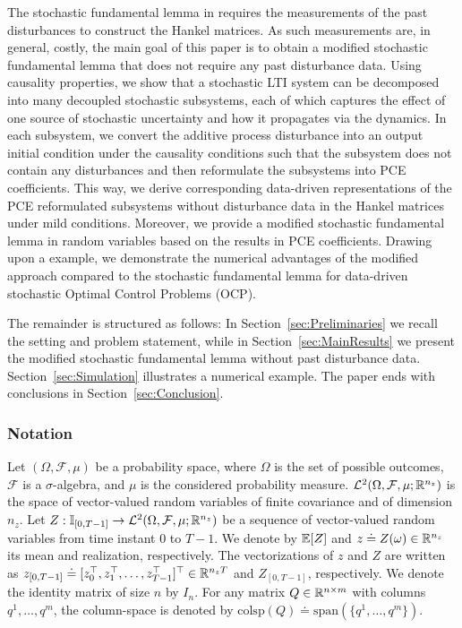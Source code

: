 The stochastic fundamental lemma in \citet{pan23stochastic} requires the measurements of the past disturbances to construct the Hankel matrices. As such measurements are, in general, costly, the main goal of this paper is to obtain a modified stochastic fundamental lemma that does not require any past disturbance data. Using causality properties, we show that a stochastic LTI system can be decomposed into many decoupled stochastic subsystems, each of which captures the effect of one source of stochastic uncertainty and how it propagates via the dynamics. In each subsystem, we convert the additive process disturbance into an output initial condition under the causality conditions such that the subsystem does not contain any disturbances and then reformulate the subsystems into PCE coefficients. This way, we derive corresponding data-driven representations of the PCE reformulated subsystems without disturbance data in the Hankel matrices under mild conditions. Moreover, we provide a modified stochastic fundamental lemma in random variables based on the results in PCE coefficients. Drawing upon a example, we demonstrate the numerical advantages of the modified approach compared to the stochastic fundamental lemma for data-driven stochastic Optimal Control Problems (OCP).

The remainder is structured as follows: In Section~\ref{sec:Preliminaries} we recall the setting and problem statement, while in Section~\ref{sec:MainResults} we present the modified stochastic fundamental lemma without past disturbance data. Section~\ref{sec:Simulation} illustrates a numerical example. The paper ends with conclusions in Section~\ref{sec:Conclusion}.

\subsubsection*{Notation}
Let $(\Omega,\mathcal F,\mu)$ be a probability space, where $\Omega$ is the set of possible outcomes, $\mathcal{F}$ is a $\sigma$-algebra, and $\mu$ is the considered probability measure.
$\mathcal{L}^2(\Omega, \mathcal{F}, \mu; \mathbb{R}^{n_z})$  is the space of vector-valued random variables of finite covariance and of dimension $n_z$.
Let $Z: \mathbb{I}_{[0,T-1]} \rightarrow \mathcal{L}^2(\Omega, \mathcal{F}, \mu; \mathbb{R}^{n_z})$ be a sequence of vector-valued random variables from time instant 0 to $T-1$. We denote by $\mathbb{E}[Z]$ and $z\doteq Z(\omega) \in \mathbb{R}^{n_z}$ its mean and realization, respectively. The vectorizations of $z$ and $Z$ are written as $z_{[0,T-1]} \doteq [z_0^\top,z_1^\top, \dots,z_{T-1}^\top]^\top \in \mathbb{R}^{n_z T}$ and $Z_{[0,T-1]}$, respectively.
We denote the identity matrix of size $n$ by $I_n$.
For any matrix $Q\in \mathbb{R}^{n\times m}$ with columns $q^1, \dots, q^m$, the column-space is denoted by $\mathrm{colsp}(Q) \doteq \mathrm{span}\left(\{q^1,\dots, q^m\}\right)$.
